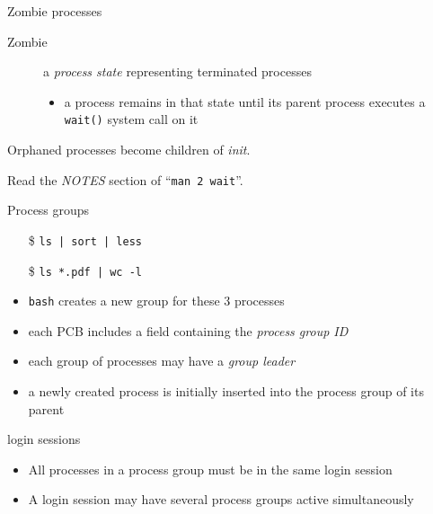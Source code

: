 \begin{frame}%
  \begin{block}{Zombie processes}
    \begin{description}
    \item[Zombie] a \emph{process state} representing terminated processes
      \begin{itemize}
      \item a process remains in that state until its parent process executes a
        \texttt{wait()} system call on it
      \end{itemize}
    \end{description}
  \end{block}
  Orphaned processes become children of \emph{init}.
\end{frame}

Read the \emph{NOTES} section of ``\texttt{man 2 wait}''.

\begin{frame}
  \begin{block}{Process groups}
    \begin{itemize}
    \item[\$] \texttt{ls | sort | less}
    \item[\$] \texttt{ls *.pdf | wc -l}
    \end{itemize}
    \begin{center}
    \end{center}
  \end{block}
\end{frame}

\begin{frame}
  \begin{itemize}
  \item \texttt{bash} creates a new group for these 3 processes
  \item each PCB includes a field containing the \emph{process group ID}
  \item each group of processes may have a \emph{group leader}
  \item a newly created process is initially inserted into the process group of its parent
  \end{itemize}
  \begin{block}{login sessions}
    \begin{itemize}
    \item All processes in a process group must be in the same login session
    \item A login session may have several process groups active simultaneously
    \end{itemize}
  \end{block}
\end{frame}

